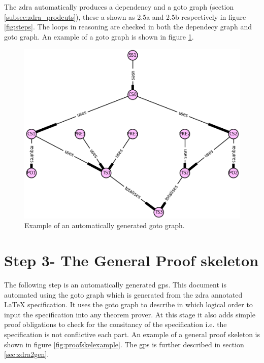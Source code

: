 The \gls{zdra} automatically produces a dependency and a goto graph (section \ref{subsec:zdra_prodcuts}), these a shown as 2.5a and 2.5b respectively in figure \ref{fig:steps}. The loops in reasoning are checked in both the dependecy graph and goto graph. An example of a goto graph is shown in figure \ref{fig:gotoexamplee}.

\begin{figure}[H]
 \begin{center}
 \includegraphics [scale=0.4]{Figures/Design/goto.png}
 \caption{Example of an automatically generated goto graph.}
 \label{fig:gotoexamplee}
\end{center}
\end{figure} 

\section{Step 3- The General Proof skeleton}

The following step is an automatically generated \gls{gps}. This document is automated using the goto graph which is generated from the \gls{zdra} annotated \LaTeX{} specification. It uses the goto graph to describe in which logical order to input the specification into any theorem prover. At this stage it also adds simple proof obligations to check for the consitancy of the specification i.e. the specification is not conflictive each part. An example of a general proof skeleton is shown in figure \ref{fig:proofskelexample}. The \gls{gps} is further described in section \ref{sec:zdra2gen}.


